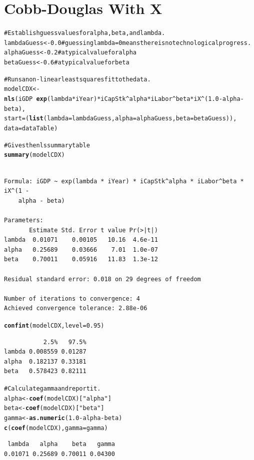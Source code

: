 \documentclass[10pt]{article}\usepackage{graphicx, color}
\makeatletter
\newcommand{\hlfunctioncall}[1]{\textcolor[rgb]{0.501960784313725,0,0.329411764705882}{\textbf{#1}}}%
\newcommand{\hlstring}[1]{\textcolor[rgb]{0.6,0.6,1}{#1}}%
\newcommand{\hlcomment}[1]{\textcolor[rgb]{0.180392156862745,0.6,0.341176470588235}{#1}}%
\newenvironment{kframe}{%
 \def\at@end@of@kframe{}%
 \ifinner\ifhmode%
  \def\at@end@of@kframe{\end{minipage}}%
  \begin{minipage}{\columnwidth}%
 \fi\fi%
 \def\FrameCommand##1{\hskip\@totalleftmargin \hskip-\fboxsep
 \colorbox{shadecolor}{##1}\hskip-\fboxsep
     \hskip-\linewidth \hskip-\@totalleftmargin \hskip\columnwidth}%
 \MakeFramed {\advance\hsize-\width
   \@totalleftmargin\z@ \linewidth\hsize
   \@setminipage}}%
 {\par\unskip\endMakeFramed%
 \at@end@of@kframe}
\newenvironment{knitrout}{}{} %
\makeatother
\begin{document}
\section{Cobb-Douglas With X}

\begin{knitrout}
\color{fgcolor}\begin{kframe}
\begin{alltt}
\hlcomment{# Establish guess values for alpha, beta, and lambda.}
lambdaGuess <- 0.0 \hlcomment{# guessing lambda = 0 means there is no technological progress.}
alphaGuess <- 0.2 \hlcomment{# a typical value for alpha}
betaGuess <- 0.6 \hlcomment{# a typical value for beta}

\hlcomment{# Runs a non-linear least squares fit to the data.}
modelCDX <- \hlfunctioncall{nls}(iGDP ~ \hlfunctioncall{exp}(lambda*iYear) * iCapStk^alpha * iLabor^beta * iX^(1.0 - alpha - beta), 
                start=(\hlfunctioncall{list}(lambda=lambdaGuess,alpha=alphaGuess,beta=betaGuess)),
                data=dataTable)

\hlcomment{# Gives the nls summary table}
\hlfunctioncall{summary}(modelCDX)
\end{alltt}
\begin{verbatim}

Formula: iGDP ~ exp(lambda * iYear) * iCapStk^alpha * iLabor^beta * iX^(1 - 
    alpha - beta)

Parameters:
       Estimate Std. Error t value Pr(>|t|)
lambda  0.01071    0.00105   10.16  4.6e-11
alpha   0.25689    0.03666    7.01  1.0e-07
beta    0.70011    0.05916   11.83  1.3e-12

Residual standard error: 0.018 on 29 degrees of freedom

Number of iterations to convergence: 4 
Achieved convergence tolerance: 2.88e-06 
\end{verbatim}
\begin{alltt}
\hlfunctioncall{confint}(modelCDX, level = 0.95)
\end{alltt}


{\ttfamily\noindent\itshape\color{messagecolor}{Waiting for profiling to be done...}}\begin{verbatim}
           2.5%   97.5%
lambda 0.008559 0.01287
alpha  0.182137 0.33181
beta   0.578423 0.82111
\end{verbatim}
\begin{alltt}

\hlcomment{# Calculate gamma and report it.}
alpha <- \hlfunctioncall{coef}(modelCDX)[\hlstring{"alpha"}] 
beta <- \hlfunctioncall{coef}(modelCDX)[\hlstring{"beta"}] 
gamma <- \hlfunctioncall{as.numeric}(1.0 - alpha - beta)
\hlfunctioncall{c}(\hlfunctioncall{coef}(modelCDX),gamma=gamma)
\end{alltt}
\begin{verbatim}
 lambda   alpha    beta   gamma 
0.01071 0.25689 0.70011 0.04300 
\end{verbatim}
\begin{alltt}


\end{alltt}
\end{kframe}
\end{knitrout}
\end{document}
